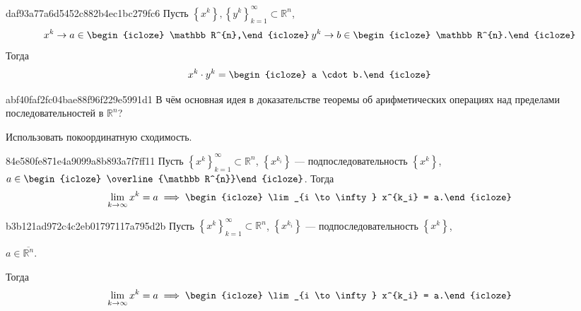 \begin{note}{daf93a77a6d5452c882b4ec1bc279fc6}
    Пусть \({ \left\{ x^{k} \right\}, \left\{ y^{k} \right\}_{k = 1}^{\infty} \subset \mathbb R^{n} }\),
    \[
        x^{k} \to a \in \begin{icloze}{2}\mathbb R^{n},\end{icloze}\: y^{k} \to b \in \begin{icloze}{2}\mathbb R^{n}.\end{icloze}
    \]
    Тогда
    \[
        x^{k} \cdot y^{k} = \begin{icloze}{1}a \cdot b.\end{icloze}
    \]
\end{note}

\begin{note}{abf40faf2fc04bae88f96f229e5991d1}
    В чём основная идея в доказательстве теоремы об арифметических операциях над пределами последовательностей в \({ \mathbb R^{n} }\)?

    \begin{cloze}{1}
        Использовать покоординатную сходимость.
    \end{cloze}
\end{note}

\begin{note}{84e580fe871e4a9099a8b893a7f7ff11}
    Пусть \({ \left\{ x^{k} \right\}_{k = 1}^{\infty} \subset \mathbb R^{n} }\),\: \({ \left\{ x^{k_i} \right\} }\) --- подпоследовательность \({ \left\{ x^{k} \right\} }\),\: \({ a \in \begin{icloze}{2}\overline{\mathbb R^{n}}\end{icloze} }\).
    Тогда
    \[
        \lim_{k \to \infty} x^{k} = a \implies \begin{icloze}{1}\lim_{i \to \infty} x^{k_i} = a.\end{icloze}
    \]
\end{note}

\begin{note}{b3b121ad972c4c2eb01797117a795d2b}
    Пусть \({ \left\{ x^{k} \right\}_{k = 1}^{\infty} \subset \mathbb R^{n} }\),\: \({ \left\{ x^{k_i} \right\} }\) --- подпоследовательность \({ \left\{ x^{k} \right\} }\),\: \begin{icloze}{2}\({ a \in \overline{\mathbb R^{n}} }\).\end{icloze}
    Тогда
    \[
        \lim_{k \to \infty} x^{k} = a \implies \begin{icloze}{1}\lim_{i \to \infty} x^{k_i} = a.\end{icloze}
    \]
\end{note}

